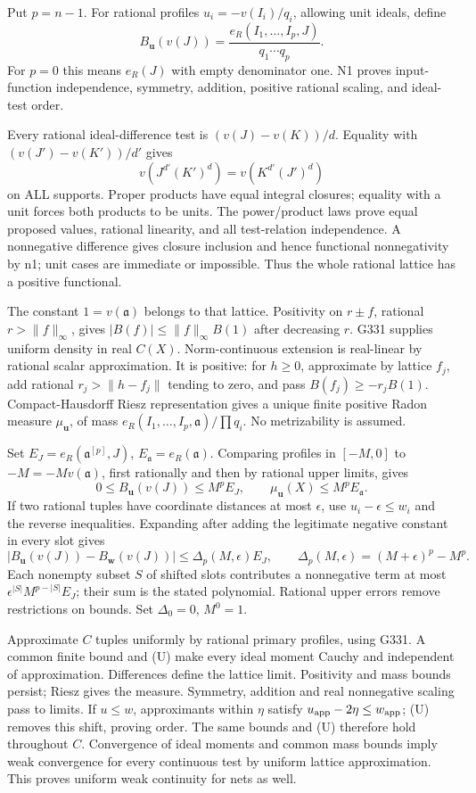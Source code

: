 Put \(p=n-1\). For rational profiles \(u_i=-v(I_i)/q_i\), allowing unit ideals, define
\[
B_{\boldsymbol u}(v(J))=\frac{e_R(I_1,\ldots,I_p,J)}{q_1\cdots q_p}.
\]
For \(p=0\) this means \(e_R(J)\) with empty denominator one. N1 proves input-function independence, symmetry, addition, positive rational scaling, and ideal-test order.

Every rational ideal-difference test is \((v(J)-v(K))/d\). Equality with \((v(J')-v(K'))/d'\) gives
\[
v(J^{d'}(K')^d)=v(K^{d'}(J')^d)
\]
on ALL supports. Proper products have equal integral closures; equality with a unit forces both products to be units. The power/product laws prove equal proposed values, rational linearity, and all test-relation independence. A nonnegative difference gives closure inclusion and hence functional nonnegativity by n1; unit cases are immediate or impossible. Thus the whole rational lattice has a positive functional.

The constant \(1=v(\mathfrak a)\) belongs to that lattice. Positivity on \(r\pm f\), rational \(r>\|f\|_\infty\), gives \(|B(f)|\le\|f\|_\infty B(1)\) after decreasing \(r\). G331 supplies uniform density in real \(C(X)\). Norm-continuous extension is real-linear by rational scalar approximation. It is positive: for \(h\ge0\), approximate by lattice \(f_j\), add rational \(r_j>\|h-f_j\|\) tending to zero, and pass \(B(f_j)\ge-r_jB(1)\). Compact-Hausdorff Riesz representation gives a unique finite positive Radon measure \(\mu_{\boldsymbol u}\), of mass \(e_R(I_1,\ldots,I_p,\mathfrak a)/\prod q_i\). No metrizability is assumed.

Set \(E_J=e_R(\mathfrak a^{[p]},J)\), \(E_{\mathfrak a}=e_R(\mathfrak a)\). Comparing profiles in \([-M,0]\) to \(-M=-Mv(\mathfrak a)\), first rationally and then by rational upper limits, gives
\[
0\le B_{\boldsymbol u}(v(J))\le M^pE_J,\qquad
\mu_{\boldsymbol u}(X)\le M^p E_{\mathfrak a}.
\]
If two rational tuples have coordinate distances at most \(\epsilon\), use \(u_i-\epsilon\le w_i\) and the reverse inequalities. Expanding after adding the legitimate negative constant in every slot gives
\[
|B_{\boldsymbol u}(v(J))-B_{\boldsymbol w}(v(J))|
\le\Delta_p(M,\epsilon)E_J,\qquad
\Delta_p(M,\epsilon)=(M+\epsilon)^p-M^p. \tag{U}
\]
Each nonempty subset \(S\) of shifted slots contributes a nonnegative term at most \(\epsilon^{|S|}M^{p-|S|}E_J\); their sum is the stated polynomial. Rational upper errors remove restrictions on bounds. Set \(\Delta_0=0\), \(M^0=1\).

Approximate \(C\) tuples uniformly by rational primary profiles, using G331. A common finite bound and (U) make every ideal moment Cauchy and independent of approximation. Differences define the lattice limit. Positivity and mass bounds persist; Riesz gives the measure. Symmetry, addition and real nonnegative scaling pass to limits. If \(u\le w\), approximants within \(\eta\) satisfy \(u_{\rm app}-2\eta\le w_{\rm app}\); (U) removes this shift, proving order. The same bounds and (U) therefore hold throughout \(C\). Convergence of ideal moments and common mass bounds imply weak convergence for every continuous test by uniform lattice approximation. This proves uniform weak continuity for nets as well.

